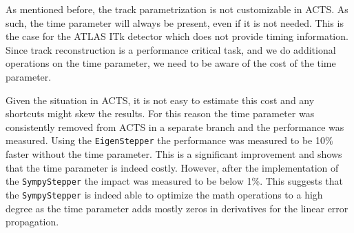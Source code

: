 As mentioned before, the track parametrization is not customizable in ACTS. As such, the time parameter will always be present, even if it is not needed. This is the case for the ATLAS ITk detector which does not provide timing information. Since track reconstruction is a performance critical task, and we do additional operations on the time parameter, we need to be aware of the cost of the time parameter.

Given the situation in ACTS, it is not easy to estimate this cost and any shortcuts might skew the results. For this reason the time parameter was consistently removed from ACTS in a separate branch and the performance was measured. Using the \texttt{EigenStepper} the performance was measured to be 10\% faster without the time parameter. This is a significant improvement and shows that the time parameter is indeed costly. However, after the implementation of the \texttt{SympyStepper} the impact was measured to be below 1\%. This suggests that the \texttt{SympyStepper} is indeed able to optimize the math operations to a high degree as the time parameter adds mostly zeros in derivatives for the linear error propagation.
